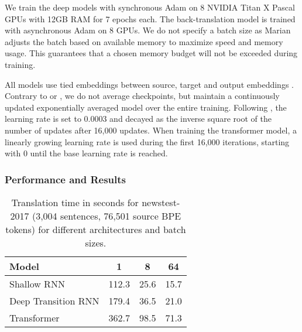 \documentclass[11pt,a4paper]{article}
\begin{document}
We train the deep models with synchronous Adam on 8 NVIDIA Titan X Pascal GPUs with 12GB RAM for 7 epochs each. The back-translation model is trained with asynchronous Adam on 8 GPUs. We do not specify a batch size as Marian adjusts the batch based on available memory to maximize speed and memory usage.  This guarantees that a chosen memory budget will not be exceeded during training.

All models use tied embeddings between source, target and output embeddings \cite{press2017using}. Contrary to  or , we do not average checkpoints, but maintain a continuously updated exponentially averaged model over the entire training. Following , the learning rate is set to 0.0003 and decayed as the inverse square root of the number of updates after 16,000 updates. When training the transformer model, a linearly growing learning rate is used during the first 16,000 iterations, starting with 0 until the base learning rate is reached. 

\subsubsection{Performance and Results}

\begin{table}[t]
\centering
\begin{tabular}{lccc}\toprule
Model & 1 & 8 & 64 \\ \midrule
Shallow RNN & 112.3 & 25.6 & 15.7\\
Deep Transition RNN & 179.4 & 36.5 & 21.0\\
Transformer & 362.7 & 98.5 & 71.3\\ \bottomrule
\end{tabular}
\caption{Translation time in seconds for newstest-2017 (3,004 sentences, 76,501 source BPE tokens) for different architectures and batch sizes.}
\label{tab-trans}
\end{table}



\end{document}
